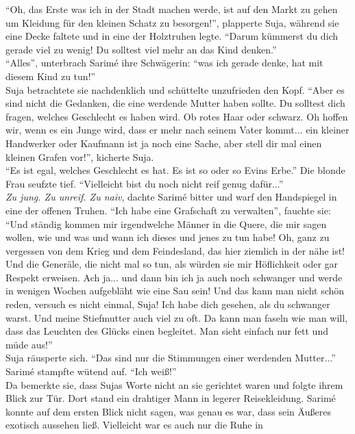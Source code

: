 ``Oh, das Erste was ich in der Stadt machen werde, ist auf den Markt zu gehen um Kleidung für den 
kleinen Schatz zu besorgen!'', plapperte Suja, während sie eine Decke faltete und in eine der 
Holztruhen legte. ``Darum kümmerst du dich gerade viel zu wenig! Du solltest viel mehr an das Kind 
denken.''\\
``Alles'', unterbrach Sarimé ihre Schwägerin: ``was ich gerade denke, hat mit diesem Kind zu 
tun!''\\
Suja betrachtete sie nachdenklich und schüttelte unzufrieden den Kopf. ``Aber es sind nicht die 
Gedanken, die eine werdende Mutter haben sollte. Du solltest dich fragen, welches Geschlecht es 
haben wird. Ob rotes Haar oder schwarz. Oh hoffen wir, wenn es ein Junge wird, dass er mehr nach 
seinem Vater kommt... ein kleiner Handwerker oder Kaufmann ist ja noch eine Sache, aber stell dir 
mal einen kleinen Grafen vor!'', kicherte Suja.\\
``Es ist egal, welches Geschlecht es hat. Es ist so oder so Evins Erbe.''
Die blonde Frau seufzte tief. ``Vielleicht bist du noch nicht reif genug dafür...''\\
\textit{Zu jung. Zu unreif. Zu naiv}, dachte Sarimé bitter und warf den Handspiegel in eine der 
offenen Truhen. ``Ich habe eine Grafschaft zu verwalten'', fauchte sie: ``Und ständig kommen mir 
irgendwelche Männer in die Quere, die mir sagen wollen, wie und was und wann ich dieses und jenes 
zu tun habe! Oh, ganz zu vergessen von dem Krieg und dem Feindesland, das hier ziemlich in der nähe 
ist! Und die Generäle, die nicht mal so tun, als würden sie mir Höflichkeit oder gar Respekt 
erweisen. Ach ja... und dann bin ich ja auch noch schwanger und werde in wenigen Wochen aufgebläht 
wie eine Sau sein! Und das kann man nicht schön reden, versuch es nicht einmal, Suja! Ich habe dich 
gesehen, als du schwanger warst. Und meine Stiefmutter auch viel zu oft. Da kann man faseln wie man 
will, dass das Leuchten des Glücks einen begleitet. Man sieht einfach nur fett und müde aus!''\\
Suja räusperte sich. ``Das sind nur die Stimmungen einer werdenden Mutter...''\\
Sarimé stampfte wütend auf. ``Ich weiß!''\\
Da bemerkte sie, dass Sujas Worte nicht an sie gerichtet waren und folgte ihrem Blick zur Tür. Dort 
stand ein drahtiger Mann in legerer Reisekleidung. Sarimé konnte auf dem ersten Blick nicht sagen, 
was genau es war, dass sein Äußeres exotisch aussehen ließ. Vielleicht war es auch nur die Ruhe in 
